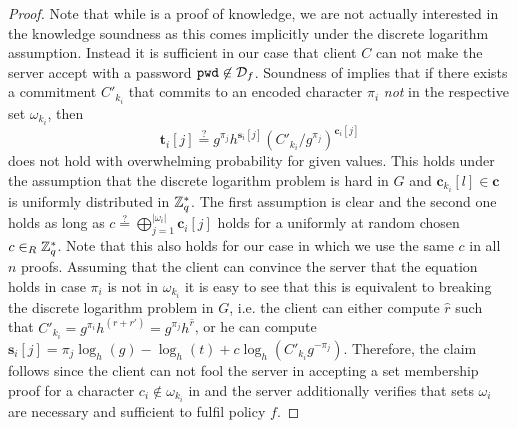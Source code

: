 \begin{proof}
Note that while \PoM is a proof of knowledge, we are not actually interested in the knowledge soundness as this comes implicitly under the discrete logarithm assumption.
Instead it is sufficient in our case that client $C$ can not make the server accept \PoM with a password $\mathtt{pwd}\not\in\mathcal{D}_f$.
Soundness of \PoM implies that if there exists a commitment $C'_{k_i}$ that commits to an encoded character $\pi_i$ \emph{not} in the respective set $\omega_{k_i}$, then
\[ \bm t_i[j] \stackrel{?}{=} g^{\pi_j}h^{\bm s_i[j]}(C'_{k_i}/g^{\pi_j})^{\bm c_i[j]} \]
does not hold with overwhelming probability for given values.
This holds under the assumption that the discrete logarithm problem is hard in $G$ and $\bm c_{k_i}[l] \in \bm c$ is uniformly distributed in $\mathbb{Z}^\ast_q$.
The first assumption is clear and the second one holds as long as $c\stackrel{?}{=}\bigoplus_{j=1}^{|\omega_i|}\bm c_i[j]$ holds for a uniformly at random chosen $c\in_R\mathbb{Z}^\ast_q$.
Note that this also holds for our case in which we use the same $c$ in all $n$ proofs.
Assuming that the client can convince the server that the equation holds in case $\pi_i$ is not in $\omega_{k_i}$ it is easy to see that this is equivalent to breaking the discrete logarithm problem in $G$, i.e. the client can either compute $\hat{r}$ such that $C'_{k_i}=g^{\pi_i}h^{(r+r')}=g^{\pi_j}h^{\hat{r}}$, or he can compute $\bm s_i[j]=\pi_j \log_h(g) - \log_h(t) + c\log_h(C'_{k_i}g^{-\pi_j})$.
Therefore, the claim follows since the client can not fool the server in accepting a set membership proof for a character $c_i\not\in\omega_{k_i}$ in \pwd and the server additionally verifies that sets $\omega_i$ are necessary and sufficient to fulfil policy $f$.

\end{proof}

% 
% 
% 
